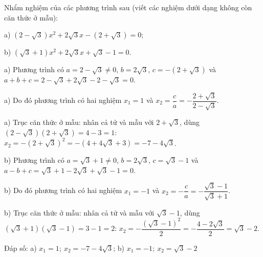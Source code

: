 \begin{problem}[9DS-PT2-026]
Nhẩm nghiệm của các phương trình sau (viết các nghiệm dưới dạng không còn căn thức ở mẫu):

a) $(2 - \sqrt{3})x^2 + 2\sqrt{3}x - (2 + \sqrt{3}) = 0$;

b) $(\sqrt{3} + 1)x^2 + 2\sqrt{3}x + \sqrt{3} - 1 = 0$.

\begin{solution}
a) Phương trình có $a = 2 - \sqrt{3} \neq 0$, $b = 2\sqrt{3}$, $c = -(2 + \sqrt{3})$ và $a + b + c = 2 - \sqrt{3} + 2\sqrt{3} - 2 - \sqrt{3} = 0$.

a) Do đó phương trình có hai nghiệm $x_1 = 1$ và $x_2 = \dfrac{c}{a} = -\dfrac{2 + \sqrt{3}}{2 - \sqrt{3}}$.

a) Trục căn thức ở mẫu: nhân cả tử và mẫu với $2 + \sqrt{3}$, dùng $(2 - \sqrt{3})(2 + \sqrt{3}) = 4 - 3 = 1$: $x_2 = -(2 + \sqrt{3})^2 = -(4 + 4\sqrt{3} + 3) = -7 - 4\sqrt{3}$.

b) Phương trình có $a = \sqrt{3} + 1 \neq 0$, $b = 2\sqrt{3}$, $c = \sqrt{3} - 1$ và $a - b + c = \sqrt{3} + 1 - 2\sqrt{3} + \sqrt{3} - 1 = 0$.

b) Do đó phương trình có hai nghiệm $x_1 = -1$ và $x_2 = -\dfrac{c}{a} = -\dfrac{\sqrt{3} - 1}{\sqrt{3} + 1}$.

b) Trục căn thức ở mẫu: nhân cả tử và mẫu với $\sqrt{3} - 1$, dùng $(\sqrt{3} + 1)(\sqrt{3} - 1) = 3 - 1 = 2$: $x_2 = -\dfrac{(\sqrt{3} - 1)^2}{2} = -\dfrac{4 - 2\sqrt{3}}{2} = \sqrt{3} - 2$.

Đáp số: a) $\boxed{x_1 = 1;\ x_2 = -7 - 4\sqrt{3}}$; b) $\boxed{x_1 = -1;\ x_2 = \sqrt{3} - 2}$
\end{solution}
\end{problem}

